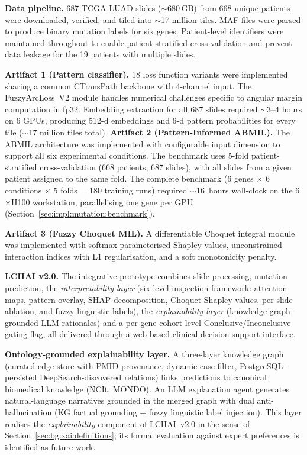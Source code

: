 \textbf{Data pipeline.}
687 TCGA-LUAD slides ($\sim$680\,GB) from 668 unique patients were
downloaded, verified, and tiled into $\sim$17 million tiles.
MAF files were parsed to produce binary mutation labels for six genes.
Patient-level identifiers were maintained throughout to enable
patient-stratified cross-validation and prevent data leakage for the
19 patients with multiple slides.


\textbf{Artifact 1 (Pattern classifier).}
18 loss function variants were implemented sharing a common CTransPath
backbone with 4-channel input.
The FuzzyArcLoss~V2 module handles numerical challenges specific to
angular margin computation in fp32.
Embedding extraction for all 687 slides required $\sim$3--4 hours on
6 GPUs, producing 512-d embeddings and 6-d pattern probabilities for
every tile ($\sim$17 million tiles total).
\textbf{Artifact 2 (Pattern-Informed ABMIL).}
The ABMIL architecture was implemented with configurable input dimension
to support all six experimental conditions.
The benchmark uses 5-fold patient-stratified cross-validation
(668 patients, 687 slides), with all slides from a given patient
assigned to the same fold.
The complete benchmark (6 genes $\times$ 6 conditions $\times$ 5 folds
= 180 training runs) required $\sim$16~hours wall-clock on the 6$\times$H100
workstation, parallelising one gene per GPU
(Section~\ref{sec:impl:mutation:benchmark}).

\textbf{Artifact 3 (Fuzzy Choquet MIL).}
A differentiable Choquet integral module was implemented with
softmax-parameterised Shapley values, unconstrained interaction indices
with L1 regularisation, and a soft monotonicity penalty.

\textbf{LCHAI v2.0.}
The integrative prototype combines slide processing, mutation
prediction, the \emph{interpretability layer} (six-level inspection
framework: attention maps, pattern overlay, SHAP decomposition,
Choquet Shapley values, per-slide ablation, and fuzzy linguistic
labels), the \emph{explainability layer} (knowledge-graph--grounded
LLM rationales) and a per-gene cohort-level Conclusive/Inconclusive
gating flag, all delivered through a web-based clinical decision
support interface.

\textbf{Ontology-grounded explainability layer.}
A three-layer knowledge graph (curated edge store with PMID
provenance, dynamic case filter, PostgreSQL-persisted
DeepSearch-discovered relations) links predictions to canonical
biomedical knowledge (NCIt, MONDO).
An LLM explanation agent generates natural-language narratives
grounded in the merged graph with dual anti-hallucination (KG
factual grounding $+$ fuzzy linguistic label injection).
This layer realises the \emph{explainability} component of LCHAI~v2.0
in the sense of Section~\ref{sec:bg:xai:definitions};
its formal evaluation against expert preferences is identified as
future work.

